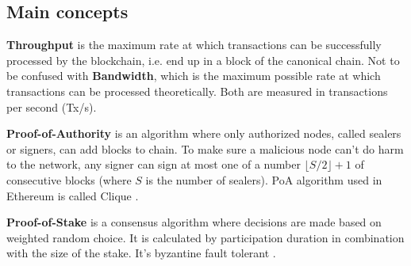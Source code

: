 \subsection{Main concepts}

\textbf{Throughput} is the maximum rate at which transactions can be successfully processed by the blockchain, i.e. end up in a block of the canonical chain. Not to be confused with \textbf{Bandwidth}, which is the maximum possible rate at which transactions can be processed theoretically. Both are measured in transactions per second (Tx/s).

\textbf{Proof-of-Authority} is an algorithm where only authorized nodes, called sealers or signers, can add blocks to chain. To make sure a malicious node can’t do harm to the network, any signer can sign at most one of a number $\lfloor S/2 \rfloor + 1$ of consecutive blocks (where $S$ is the number of sealers). PoA algorithm used in Ethereum is called Clique \cite{clique}.

\textbf{Proof-of-Stake} is a consensus algorithm where decisions are made based on weighted random choice. It is calculated by participation duration in combination with the size of the stake. It’s byzantine fault tolerant \cite{pos}.
